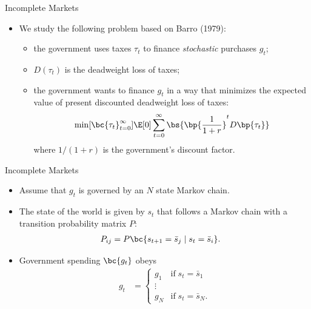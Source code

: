 \documentclass[11pt,xcolor={dvipsnames},aspectratio=159,hyperref={pdftex,pdfpagemode=UseNone,hidelinks,pdfdisplaydoctitle=true},usepdftitle=false]{beamer}
\begin{document}
    \begin{frame}{Incomplete Markets}
    \begin{itemize}
    \item We study the following problem based on Barro (1979):
    \begin{itemize}
    \item the government uses taxes $\tau_{t}$ to finance \emph{stochastic}
    purchases $g_{t}$;
    \item  $D\left(\tau_{t}\right)$  is the deadweight loss of taxes;
    \item the government wants to finance $g_{t}$ in a way that minimizes the
    expected value of present discounted deadweight loss of taxes: 
    \[
    \min[\bc{\tau_t}_{t=0}^\infty] \E[0] \sum_{t=0}^\infty \bs{\bp{\frac{1}{1+r}}^t D\bp{\tau_t}}
    \]
    where $1/\left(1+r\right)$ is the government's discount factor.
    \end{itemize}
    \end{itemize}
    \end{frame}
    \begin{frame}{Incomplete Markets}
    \begin{itemize}
    \item Assume that $g_{t}$ is governed by an $N$ state Markov chain.
    \item The state of the world is given by $s_{t}$ that follows a Markov
    chain with a transition probability matrix $P$: 
    \begin{align*}
    P_{ij} & =P\bc{s_{t+1}=\bar{s}_{j}\mid s_{t}=\bar{s}_{i}}. 
    \end{align*}
    \item Government spending $\bc{g_t}$ obeys 
    \begin{align*}
    g_{t} & =\begin{cases}
    g_{1} & \text{if}\;s_{t}=\bar{s}_{1}\\
    \vdots\\
    g_{N} & \text{if}\;s_{t}=\bar{s}_{N}.
    \end{cases}
    \end{align*}
    \end{itemize}
    \end{frame}
    
\end{document}
